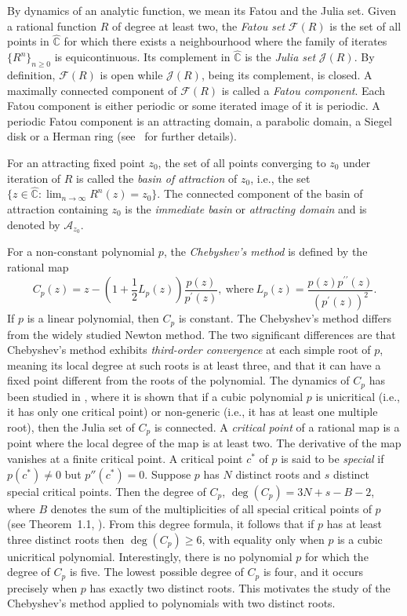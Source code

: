 \documentclass[12pt]{article}
\begin{document}
\par By dynamics of an analytic function, we mean its Fatou and the Julia set.  
Given a rational function $R$ of degree at least two, the \textit{Fatou set} $\mathcal{F}(R)$ is the set of all points in $\widehat{\mathbb{C}}$ for which there exists a neighbourhood where the family of iterates $\{R^n\}_{n \geq 0}$ is equicontinuous. 
Its complement in $\widehat{\mathbb{C}}$ is the \textit{Julia set} $\mathcal{J}(R)$.  
By definition, $\mathcal{F}(R)$ is   open  while $\mathcal{J}(R)$, being its complement, is closed. A maximally connected component of $\mathcal{F}(R)$  is called a \textit{Fatou component}. Each Fatou component is either periodic or  some iterated image of it is periodic. A periodic Fatou component is an attracting domain, a parabolic domain, a Siegel disk or a Herman ring (see~\cite{Beardon_book} for further details).  
\par  For an attracting fixed point $z_0$, the set of all points  converging to $z_0$ under iteration of $R$ is called the \textit{basin of attraction} of $z_0$, i.e., the set
$\{z \in \widehat{\mathbb{C}} : \lim_{n \to \infty} R^n(z)=z_0 \}.
$
The connected component of the basin of attraction containing $z_0$ is the \textit{immediate basin} or \textit{attracting domain} and is denoted by $\mathcal{A}_{z_0}$.  
 \par
For a non-constant polynomial $p$, the \emph{Chebyshev's method} is defined by the rational map
$$
C_p(z)=z-\left(1+\frac{1}{2} L_p(z)\right) \frac{p(z)}{p^{\prime}(z)},
~\mbox{where}~
L_p(z)=\frac{p(z) p^{\prime \prime}(z)}{\left(p^{\prime}(z)\right)^2}
\text{.}$$
If $p$ is a linear polynomial, then $C_p$ is constant. The Chebyshev's method differs from the widely studied Newton method. The two significant differences are that Chebyshev's method exhibits \emph{third-order convergence} at each simple root of $p$, meaning its local degree at such roots is at least three, and that it can have a fixed point different from the roots of the polynomial. 
The dynamics of $C_p$ has been studied in \cite{Nayak-Pal2022}, where it is shown that if a cubic polynomial $p$ is unicritical (i.e., it has only one critical point) or non-generic (i.e., it has at least one multiple root), then the Julia set of $C_p $ is connected.  A \textit{critical point} of a rational map is a point where the local degree of the map is at least two. The derivative of the map vanishes at a finite critical point. A critical point $c^*$ of $p$ is said to be \textit{special} if $p(c^*)\neq 0$ but $p''(c^*)=0$. Suppose $p$ has $N$ distinct roots and $s$ distinct special critical points. Then the degree of $C_p$,  $\deg(C_p)=3N+s-B-2$, where $B$ denotes the sum of the multiplicities of all special critical points of $p$ (see Theorem~1.1, \cite{Nayak-Pal2022}). From this degree formula, it follows that if $p$ has at least three distinct roots then $\deg(C_p)\geq 6$, with equality only when $p$ is a cubic unicritical polynomial. Interestingly, there is no polynomial $p$ for which the degree of $C_p$ is five. The lowest possible  degree of $C_p$ is four, and it occurs precisely when $p$ has exactly two distinct roots. This motivates the study of the Chebyshev's method applied to polynomials with two distinct roots.
\end{document}
